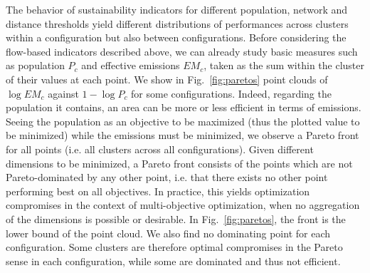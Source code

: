 \documentclass{jimis-en}
\begin{document}
The behavior of sustainability indicators for different population, network and distance thresholds yield different distributions of performances across clusters within a configuration but also between configurations. Before considering the flow-based indicators described above, we can already study basic measures such as population $P_c$ and effective emissions $EM_c$, taken as the sum within the cluster of their values at each point. We show in Fig.~\ref{fig:paretos} point clouds of $\log EM_c$ against $1 - \log P_c$ for some configurations. Indeed, regarding the population it contains, an area can be more or less efficient in terms of emissions. Seeing the population as an objective to be maximized (thus the plotted value to be minimized) while the emissions must be minimized, we observe a Pareto front for all points (i.e. all clusters across all configurations). Given different dimensions to be minimized, a Pareto front consists of the points which are not Pareto-dominated by any other point, i.e. that there exists no other point performing best on all objectives. In practice, this yields optimization compromises in the context of multi-objective optimization, when no aggregation of the dimensions is possible or desirable. In Fig.~\ref{fig:paretos}, the front is the lower bound of the point cloud. We also find no dominating point for each configuration. Some clusters are therefore optimal compromises in the Pareto sense in each configuration, while some are dominated and thus not efficient.
\end{document}
